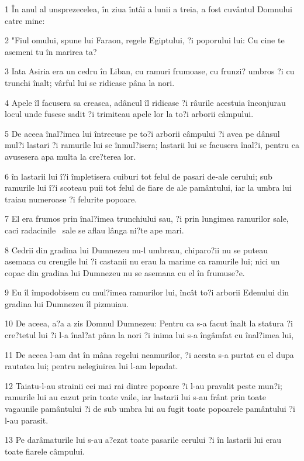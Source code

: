 \par 1 În anul al unsprezecelea, în ziua întâi a lunii a treia, a fost cuvântul Domnului catre mine:
\par 2 "Fiul omului, spune lui Faraon, regele Egiptului, ?i poporului lui: Cu cine te asemeni tu în marirea ta?
\par 3 Iata Asiria era un cedru în Liban, cu ramuri frumoase, cu frunzi? umbros ?i cu trunchi înalt; vârful lui se ridicase pâna la nori.
\par 4 Apele îl facusera sa creasca, adâncul îl ridicase ?i râurile acestuia înconjurau locul unde fusese sadit ?i trimiteau apele lor la to?i arborii câmpului.
\par 5 De aceea înal?imea lui întrecuse pe to?i arborii câmpului ?i avea pe dânsul mul?i lastari ?i ramurile lui se înmul?isera; lastarii lui se facusera înal?i, pentru ca avusesera apa multa la cre?terea lor.
\par 6 în lastarii lui î?i împletisera cuiburi tot felul de pasari de-ale cerului; sub ramurile lui î?i scoteau puii tot felul de fiare de ale pamântului, iar la umbra lui traiau numeroase ?i felurite popoare.
\par 7 El era frumos prin înal?imea trunchiului sau, ?i prin lungimea ramurilor sale, caci radacinile  sale se aflau lânga ni?te ape mari.
\par 8 Cedrii din gradina lui Dumnezeu nu-l umbreau, chiparo?ii nu se puteau asemana cu crengile lui ?i castanii nu erau la marime ca ramurile lui; nici un copac din gradina lui Dumnezeu nu se asemana cu el în frumuse?e.
\par 9 Eu îl împodobisem cu mul?imea ramurilor lui, încât to?i arborii Edenului din gradina lui Dumnezeu îl pizmuiau.
\par 10 De aceea, a?a a zis Domnul Dumnezeu: Pentru ca s-a facut înalt la statura ?i cre?tetul lui ?i l-a înal?at pâna la nori ?i inima lui s-a îngâmfat cu înal?imea lui,
\par 11 De aceea l-am dat în mâna regelui neamurilor, ?i acesta s-a purtat cu el dupa rautatea lui; pentru nelegiuirea lui l-am lepadat.
\par 12 Taiatu-l-au strainii cei mai rai dintre popoare ?i l-au pravalit peste mun?i; ramurile lui au cazut prin toate vaile, iar lastarii lui s-au frânt prin toate vagaunile pamântului ?i de sub umbra lui au fugit toate popoarele pamântului ?i l-au parasit.
\par 13 Pe darâmaturile lui s-au a?ezat toate pasarile cerului ?i în lastarii lui erau toate fiarele câmpului.
